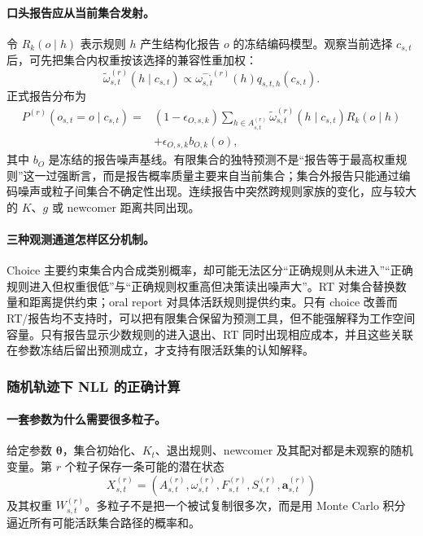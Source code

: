 \paragraph{口头报告应从当前集合发射。}
令 $R_k(o\mid h)$ 表示规则 $h$ 产生结构化报告 $o$ 的冻结编码模型。观察当前选择 $c_{s,t}$ 后，可先把集合内权重按该选择的兼容性重加权：
\begin{equation}
    \widetilde\omega^{(r)}_{s,t}(h\mid c_{s,t})
    \propto \omega^{-,(r)}_{s,t}(h)q_{s,t,h}(c_{s,t}).
    \label{eq:model0804-report-readout-weight}
\end{equation}
正式报告分布为
\begin{align}
    P^{(r)}(o_{s,t}=o\mid c_{s,t})
    =&(1-\epsilon_{O,s,k})
      \sum_{h\in A^{(r)}_{s,t}}
      \widetilde\omega^{(r)}_{s,t}(h\mid c_{s,t})R_k(o\mid h)\nonumber\\
      &+\epsilon_{O,s,k}b_{O,k}(o),
    \label{eq:model0804-oral-channel}
\end{align}
其中 $b_O$ 是冻结的报告噪声基线。有限集合的独特预测不是“报告等于最高权重规则”这一过强断言，而是报告概率质量主要来自当前集合；集合外报告只能通过编码噪声或粒子间集合不确定性出现。连续报告中突然跨规则家族的变化，应与较大的 $K$、$g$ 或 newcomer 距离共同出现。

\paragraph{三种观测通道怎样区分机制。}
Choice 主要约束集合内合成类别概率，却可能无法区分“正确规则从未进入”“正确规则进入但权重很低”与“正确规则权重高但决策读出噪声大”。RT 对集合替换数量和距离提供约束；oral report 对具体活跃规则提供约束。只有 choice 改善而 RT/报告均不支持时，可以把有限集合保留为预测工具，但不能强解释为工作空间容量。只有报告显示少数规则的进入退出、RT 同时出现相应成本，并且这些关联在参数冻结后留出预测成立，才支持有限活跃集的认知解释。


\subsubsection{随机轨迹下 NLL 的正确计算}

\paragraph{一套参数为什么需要很多粒子。}
给定参数 $\boldsymbol\theta$，集合初始化、$K_t$、退出规则、newcomer 及其配对都是未观察的随机变量。第 $r$ 个粒子保存一条可能的潜在状态
\begin{equation}
    X^{(r)}_{s,t}
    =\left(A^{(r)}_{s,t},\omega^{(r)}_{s,t},
      F^{(r)}_{s,t},S^{(r)}_{s,t},\mathbf a^{(r)}_{s,t}\right)
    \label{eq:model0804-particle-state}
\end{equation}
及其权重 $W^{(r)}_{s,t}$。多粒子不是把一个被试复制很多次，而是用 Monte Carlo 积分逼近所有可能活跃集合路径的概率和。

